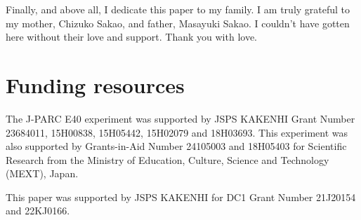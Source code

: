 Finally, and above all, I dedicate this paper to my family. I am truly grateful to my mother, Chizuko Sakao, and father, Masayuki Sakao. I couldn't have gotten here without their love and support. Thank you with love.

\section*{Funding resources}
The J-PARC E40 experiment was supported by JSPS KAKENHI Grant Number 23684011, 15H00838, 15H05442, 15H02079 and 18H03693. This experiment was also supported by Grants-in-Aid Number 24105003 and 18H05403 for Scientific Research from the Ministry of Education, Culture, Science and Technology (MEXT), Japan.

This paper was supported by JSPS KAKENHI for DC1 Grant Number 21J20154 and 22KJ0166.
%
